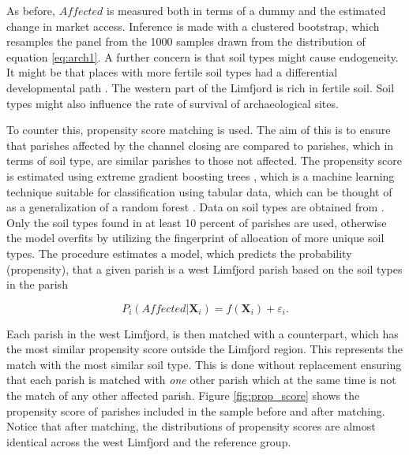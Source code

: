 \documentclass[11pt]{article}
\begin{document}
As before, $Affected$ is measured both in terms of a dummy and the estimated change in market access. Inference is made with a clustered bootstrap, which resamples the panel from the 1000 samples drawn from the distribution of equation \ref{eq:arch1}. A further concern is that soil types might cause endogeneity. It might be that places with more fertile soil types had a differential developmental path \citep{HeavyPlough2016, WinnersAndLosers2022}. The western part of the Limfjord is rich in fertile soil. Soil types might also influence the rate of survival of archaeological sites. 

To counter this, propensity score matching is used. The aim of this is to ensure that parishes affected by the channel closing are compared to parishes, which in terms of soil type, are similar parishes to those not affected. The propensity score is estimated using extreme gradient boosting trees \citep{chen2016xgboost}, which is a machine learning technique suitable for classification using tabular data, which can be thought of as a generalization of a random forest \citep{Breiman2001}. Data on soil types are obtained from \cite{Pedersen2019}. Only the soil types found in at least 10 percent of parishes are used, otherwise the model overfits by utilizing the fingerprint of allocation of more unique soil types. The procedure estimates a model, which predicts the probability (propensity), that a given parish is a west Limfjord parish based on the soil types in the parish

\begin{equation}
\label{eq:eq7_5}
P_i(Affected|\mathbf{X}_i) = f(\mathbf{X}_i)+\varepsilon_i.
\end{equation}

Each parish in the west Limfjord, is then matched with a counterpart, which has the most similar propensity score outside the Limfjord region. This represents the match with the most similar soil type. This is done without replacement ensuring that each parish is matched with \textit{one} other parish which at the same time is not the match of any other affected parish. Figure \ref{fig:prop_score} shows the propensity score of parishes included in the sample before and after matching. Notice that after matching, the distributions of propensity scores are almost identical across the west Limfjord and the reference group. 
\end{document}

